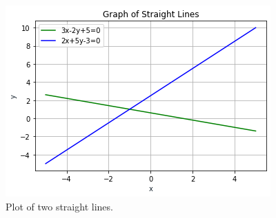 \begin{figure}[!ht] 
	\centering
	\includegraphics[width=\columnwidth]{./solutions/13/6/a6_graph.png}
	\caption{Plot of two straight lines.}
\label{fig:solutions/13/6/}
\end{figure}
